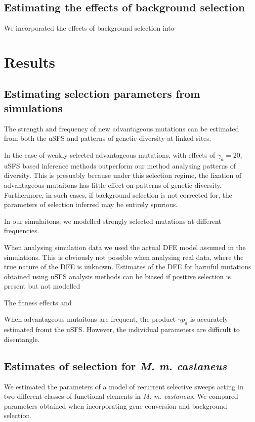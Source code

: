 \documentclass[11pt]{article}
\begin{document}
 	
\subsection*{Estimating the effects of background selection}

We incorporated the effects of background selection into 

\section*{Results}
\subsection*{Estimating selection parameters from simulations}

	The strength and frequency of new advantageous mutations can be  estimated from both the uSFS and patterns of genetic diversity at linked sites. 
	
	In the case of weakly selected advantageous mutations, with effects of $\gamma_a = 20$, uSFS based inference methods outperform our method analysing patterns of diversity. This is presuably because under this selection regime, the fixation of advantageous mutaitons has little effect on patterns of genetic diversity. Furthermore, in such cases, if background selection is not corrected for, the parameters of selection inferred may be entirely spurious.
	
	In our simulaitons, we modelled strongly selected mutations at different frequencies. 
	
	When analysing simulation data we used the actual DFE model assumed in the simulations. This is obviously not possible when analysing real data, where the true nature of the DFE is unknown. Estimates of the DFE for harmful mutations obtained using uSFS analysis methods can be biased if positive selection is present but not modelled 
	
The fitness effects and 

When advantageous mutaitons are frequent, the product $\gamma p_a$ is accurately estimated fromt the uSFS. However, the individual parameters are difficult to disentangle. 
	
	
\subsection*{Estimates of selection for \textit{M. m. castaneus}}

	We estimated the parameters of a model of recurrent selective sweeps acting in two different classes of functional elements in \textit{M. m. castaneus}. We compared parameters obtained when incorporating gene conversion and background selection.
	
\end{document}
